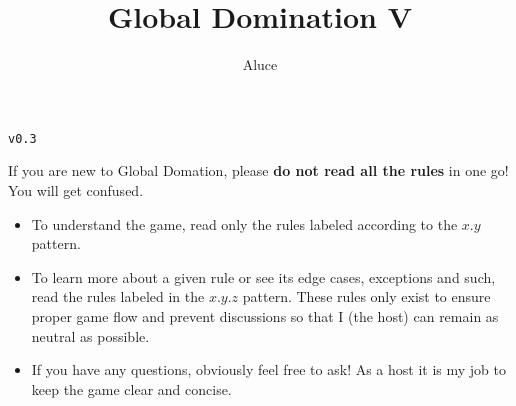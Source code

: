 \documentclass[10pt,openright,a4paper,openany]{article}
\newenvironment{warn}{
	\begin{tcolorbox}[
		colback=purple!5!white,
		colframe=purple!75!black,
	]
}{
	\end{tcolorbox}
}
\begin{document}
\title{Global Domination V}
\author{Aluce}
\maketitle

\begin{center}
\texttt{v0.3}
\end{center}

\begin{warn}
	\tcblower 
	If you are new to Global Domation, please \textbf{do not read all the rules} in one go! You will get confused.
	\begin{itemize}
		\item To understand the game, read only the rules labeled according to the $x.y$ pattern.
		\item To learn more about a given rule or see its edge cases, exceptions and such, read the rules labeled in the $x.y.z$ pattern. These rules only exist to ensure proper game flow and prevent discussions so that I (the host) can remain as neutral as possible.
		\item If you have any questions, obviously feel free to ask! As a host it is my job to keep the game clear and concise.
	\end{itemize} 
\end{warn}
\end{document}
